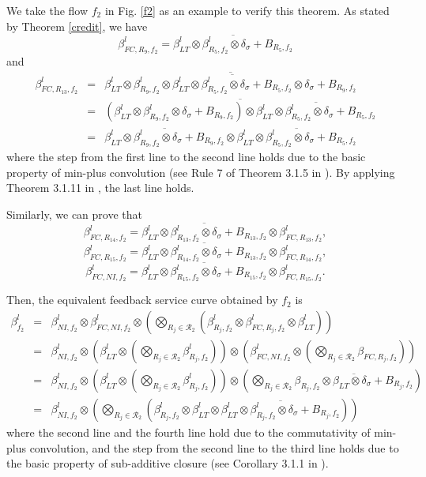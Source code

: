 \documentclass[preprint]{elsarticle}
\begin{document}
\begin{pf}
We take the flow $f_2$ in Fig. \ref{f2} as an example to verify this theorem. As stated by Theorem \ref{credit}, we have $$\beta_{FC,R_9,f_2}^l=\overline{\beta^l_{LT}\otimes\beta_{R_5,f_2}^l\otimes\delta_\sigma+B_{R_5,f_2}}$$ and
\begin{eqnarray*}
\beta_{FC,R_{13},f_2}^l&=&\overline{\beta^l_{LT}\otimes\beta^l_{R_9,f_2}\otimes\overline{\beta^l_{LT}\otimes\beta^l_{R_5,f_2}\otimes\delta_\sigma+B_{R_5,f_2}}\otimes\delta_\sigma+B_{R_9,f_2}}\label{eq1}\\
&=&\overline{(\beta^l_{LT}\otimes\beta^l_{R_9,f_2}\otimes\delta_\sigma+B_{R_9,f_2})\otimes\overline{\beta^l_{LT}\otimes\beta^l_{R_5,f_2}\otimes\delta_\sigma+B_{R_5,f_2}}}\label{eq2}\\
&=&\overline{\beta^l_{LT}\otimes\beta^l_{R_9,f_2}\otimes\delta_\sigma+B_{R_9,f_2}}\otimes\overline{\beta^l_{LT}\otimes\beta^l_{R_5,f_2}\otimes\delta_\sigma+B_{R_5,f_2}}\label{eq3}
\end{eqnarray*}
where the step from the first line to the second line holds due to the basic property of min-plus convolution (see Rule 7 of Theorem 3.1.5 in \cite{Boudec2001Network}). By applying Theorem 3.1.11 in \cite{Boudec2001Network}, the last line holds.

Similarly, we can prove that
$$\beta_{FC,R_{14},f_2}^l=\overline{\beta^l_{LT}\otimes\beta^l_{R_{13},f_2}\otimes\delta_\sigma+B_{R_{13},f_2}}\otimes\beta_{FC,R_{13},f_2}^l,$$
$$\beta_{FC,R_{15},f_2}^l=\overline{\beta^l_{LT}\otimes\beta^l_{R_{14},f_2}\otimes\delta_\sigma+B_{R_{13},f_2}}\otimes\beta_{FC,R_{14},f_2}^l,$$
$$\beta_{FC,NI,f_2}^l=\overline{\beta^l_{LT}\otimes\beta^l_{R_{15},f_2}\otimes\delta_\sigma+B_{R_{15},f_2}}\otimes\beta_{FC,R_{15},f_2}^l.$$

Then, the equivalent feedback service curve obtained by $f_2$ is
\begin{eqnarray*}
\beta_{f_2}^l&=&\beta_{NI,f_2}^l\otimes\beta_{FC,NI,f_2}^l\otimes(\underset{R_j\in\mathcal{R}_2}{\bigotimes}(\beta^l_{R_j,f_2}\otimes\beta^l_{FC,R_j,f_2}\otimes\beta_{LT}^l))\\
&=& \beta_{NI,f_2}^l\otimes(\beta_{LT}^l\otimes(\underset{R_j\in\mathcal{R}_2}{\bigotimes}\beta^l_{R_j,f_2}))\otimes(\beta_{FC,NI,f_2}^l\otimes(\underset{R_j\in\mathcal{R}_2}{\bigotimes}\beta_{FC,R_j,f_2}))\\
&=& \beta_{NI,f_2}^l\otimes(\beta_{LT}^l\otimes(\underset{R_j\in\mathcal{R}_2}{\bigotimes}\beta^l_{R_j,f_2}))\otimes(\underset{R_j\in\mathcal{R}_2}{\bigotimes}\overline{\beta_{R_j,f_2}\otimes\beta_{LT}\otimes\delta_\sigma+B_{R_j,f_2}})\\
&=& \beta_{NI,f_2}^l\otimes(\underset{R_j\in\mathcal{R}_2}{\bigotimes}(\beta^l_{R_j,f_2}\otimes\beta_{LT}^l\otimes\overline{\beta^l_{LT}\otimes\beta^l_{R_{j},f_2}\otimes\delta_\sigma+B_{R_j,f_2}}))
\end{eqnarray*}
where the second line and the fourth line hold due to the commutativity of min-plus convolution, and the step from the second line to the third line holds due to the basic property of sub-additive closure (see Corollary 3.1.1 in \cite{Boudec2001Network}).


\end{pf}
\end{document}
